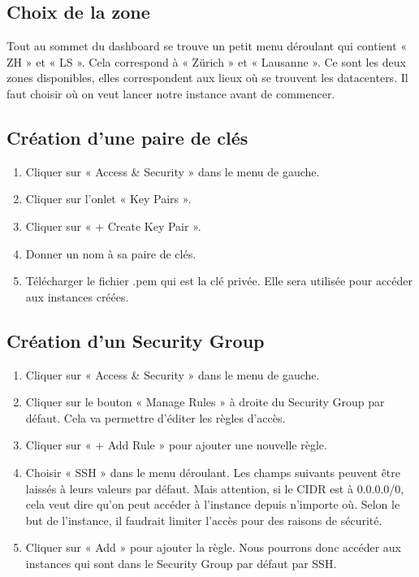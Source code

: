 \subsection{Choix de la zone}

Tout au sommet du dashboard se trouve un petit menu déroulant qui contient « ZH » et « LS ». Cela correspond à « Zürich » et « Lausanne ». Ce sont les deux zones disponibles, elles correspondent aux lieux où se trouvent les datacenters. Il faut choisir où on veut lancer notre instance avant de commencer.

\subsection{Création d'une paire de clés}

\begin{enumerate}
 \item Cliquer sur « Access \& Security » dans le menu de gauche.
 \item Cliquer sur l'onlet « Key Pairs ».
 \item Cliquer sur « + Create Key Pair ».
 \item Donner un nom à sa paire de clés.
 \item Télécharger le fichier .pem qui est la clé privée. Elle sera utilisée pour accéder aux instances créées.
\end{enumerate}


\subsection{Création d'un Security Group}

\begin{enumerate}
 \item Cliquer sur « Access \& Security » dans le menu de gauche.
 \item Cliquer sur le bouton « Manage Rules » à droite du Security Group par défaut. Cela va permettre d'éditer les règles d'accès.
 \item Cliquer sur « + Add Rule » pour ajouter une nouvelle règle.
 \item Choisir « SSH » dans le menu déroulant. Les champs suivants peuvent être laissés à leurs valeurs par défaut. Mais attention, si le CIDR est à 0.0.0.0/0, cela veut dire qu'on peut accéder à l'instance depuis n'importe où. Selon le but de l'instance, il faudrait limiter l'accès pour des raisons de sécurité.
 \item Cliquer sur « Add »  pour ajouter la règle. Nous pourrons donc accéder aux instances qui sont dans le Security Group par défaut par SSH.
\end{enumerate}

